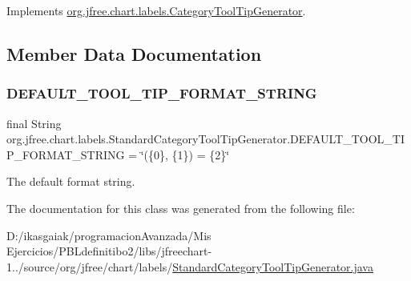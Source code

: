 Implements \mbox{\hyperlink{interfaceorg_1_1jfree_1_1chart_1_1labels_1_1_category_tool_tip_generator_a2e8b22f2efaaf190fa281212485e1018}{org.\+jfree.\+chart.\+labels.\+Category\+Tool\+Tip\+Generator}}.



\subsection{Member Data Documentation}
\mbox{\label{classorg_1_1jfree_1_1chart_1_1labels_1_1_standard_category_tool_tip_generator_affe87ac1e6d46add86b8d281d84c96a1}} 
\subsubsection{\texorpdfstring{D\+E\+F\+A\+U\+L\+T\+\_\+\+T\+O\+O\+L\+\_\+\+T\+I\+P\+\_\+\+F\+O\+R\+M\+A\+T\+\_\+\+S\+T\+R\+I\+NG}{DEFAULT\_TOOL\_TIP\_FORMAT\_STRING}}
{\footnotesize\ttfamily final String org.\+jfree.\+chart.\+labels.\+Standard\+Category\+Tool\+Tip\+Generator.\+D\+E\+F\+A\+U\+L\+T\+\_\+\+T\+O\+O\+L\+\_\+\+T\+I\+P\+\_\+\+F\+O\+R\+M\+A\+T\+\_\+\+S\+T\+R\+I\+NG = \char`\"{}(\{0\}, \{1\}) = \{2\}\char`\"{}\hspace{0.3cm}{\ttfamily [static]}}

The default format string. 

The documentation for this class was generated from the following file\+:\begin{DoxyCompactItemize}
\item 
D\+:/ikasgaiak/programacion\+Avanzada/\+Mis Ejercicios/\+P\+B\+Ldefinitibo2/libs/jfreechart-\/1../source/org/jfree/chart/labels/\mbox{\hyperlink{_standard_category_tool_tip_generator_8java}{Standard\+Category\+Tool\+Tip\+Generator.\+java}}\end{DoxyCompactItemize}
